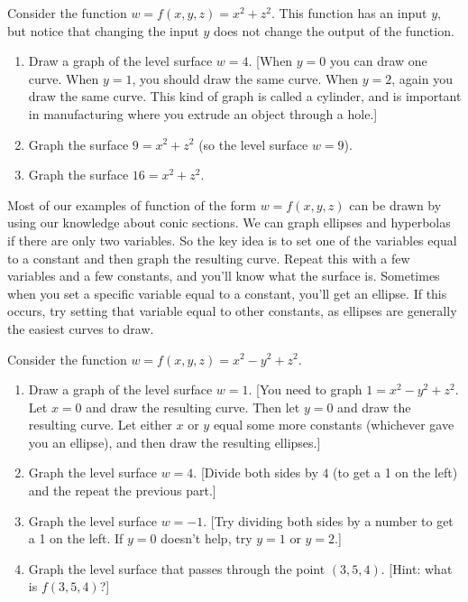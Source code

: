 \begin{problem}
%
%
Consider the function $w=f(x,y,z)=x^2+z^2$. This function has an input $y$, but notice that changing the input $y$ does not change the output of the function.
 \begin{enumerate}
  \item Draw a graph of the level surface $w=4$. [When $y=0$ you can draw one curve.  When $y=1$, you should draw the same curve.  When $y=2$, again you draw the same curve.  This kind of graph is called a cylinder, and is important in manufacturing where you extrude an object through a hole.]
  \item Graph the surface $9=x^2+z^2$ (so the level surface $w=9$).
  \item Graph the surface $16=x^2+z^2$.
 \end{enumerate}
\end{problem}

Most of our examples of function of the form $w=f(x,y,z)$ can be drawn by using our knowledge about conic sections. We can graph ellipses and hyperbolas if there are only two variables. So the key idea is to set one of the variables equal to a constant and then graph the resulting curve.  Repeat this with a few variables and a few constants, and you'll know what the surface is. Sometimes when you set a specific variable equal to a constant, you'll get an ellipse. If this occurs, try setting that variable equal to other constants, as ellipses are generally the easiest curves to draw.

\begin{problem}%
%
 Consider the function $w=f(x,y,z)=x^2-y^2+z^2$.
 \begin{enumerate}
  \item Draw a graph of the level surface $w=1$. [You need to graph $1=x^2-y^2+z^2$. Let $x=0$ and draw the resulting curve. Then let $y=0$ and draw the resulting curve. Let either $x$ or $y$ equal some more constants (whichever gave you an ellipse), and then draw the resulting ellipses.]  
  \item Graph the level surface $w=4$. [Divide both sides by $4$ (to get a 1 on the left) and the repeat the previous part.]
  \item Graph the level surface $w=-1$. [Try dividing both sides by a number to get a 1 on the left. If $y=0$ doesn't help, try $y=1$ or $y=2$.]
  \item Graph the level surface that passes through the point $(3,5,4)$. [Hint: what is $f(3,5,4)$?]
 \end{enumerate}
\end{problem}


